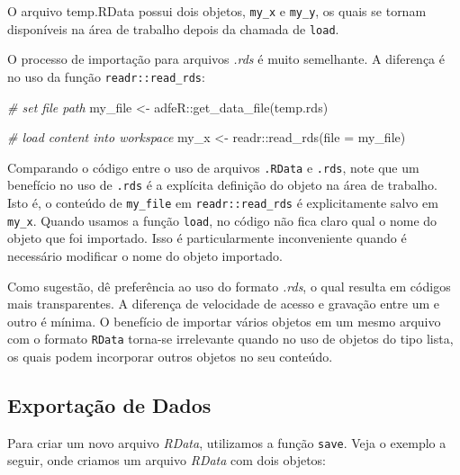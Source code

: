 \documentclass[
  11pt,
]{book}
\newenvironment{Shaded}{\begin{snugshade}}{\end{snugshade}}
\newcommand{\AttributeTok}[1]{\textcolor[rgb]{0.61,0.61,0.61}{#1}}
\newcommand{\CommentTok}[1]{\textcolor[rgb]{0.37,0.37,0.37}{\textit{#1}}}
\newcommand{\FunctionTok}[1]{\textcolor[rgb]{0,0,0}{#1}}
\newcommand{\NormalTok}[1]{#1}
\newcommand{\OtherTok}[1]{\textcolor[rgb]{0.37,0.37,0.37}{#1}}
\newcommand{\SpecialCharTok}[1]{\textcolor[rgb]{0,0,0}{#1}}
\newcommand{\StringTok}[1]{\textcolor[rgb]{0.5,0.5,0.5}{#1}}
\newenvironment{rmdimportant}
{\begin{importantblock}

	} {\end{importantblock}}
\begin{document}
O arquivo temp.RData possui dois objetos, \texttt{my\_x} e \texttt{my\_y}, os quais se tornam disponíveis na área de trabalho depois da chamada de \texttt{load}.

O processo de importação para arquivos \emph{.rds} é muito semelhante. A diferença é no uso da função \texttt{readr::read\_rds}:

\begin{Shaded}
\begin{Highlighting}[]
\CommentTok{\# set file path}
\NormalTok{my\_file }\OtherTok{\textless{}{-}}\NormalTok{ adfeR}\SpecialCharTok{::}\FunctionTok{get\_data\_file}\NormalTok{(}\StringTok{\textquotesingle{}temp.rds\textquotesingle{}}\NormalTok{)}

\CommentTok{\# load content into workspace}
\NormalTok{my\_x }\OtherTok{\textless{}{-}}\NormalTok{ readr}\SpecialCharTok{::}\FunctionTok{read\_rds}\NormalTok{(}\AttributeTok{file =}\NormalTok{ my\_file)}
\end{Highlighting}
\end{Shaded}

Comparando o código entre o uso de arquivos \texttt{.RData} e \texttt{.rds}, note que um benefício no uso de \texttt{.rds} é a explícita definição do objeto na área de trabalho. Isto é, o conteúdo de \texttt{my\_file} em \texttt{readr::read\_rds} é explicitamente salvo em \texttt{my\_x}. Quando usamos a função \texttt{load}, no código não fica claro qual o nome do objeto que foi importado. Isso é particularmente inconveniente quando é necessário modificar o nome do objeto importado.

\begin{rmdimportant}
Como sugestão, dê preferência ao uso do formato \emph{.rds}, o qual
resulta em códigos mais transparentes. A diferença de velocidade de
acesso e gravação entre um e outro é mínima. O benefício de importar
vários objetos em um mesmo arquivo com o formato \texttt{RData} torna-se
irrelevante quando no uso de objetos do tipo lista, os quais podem
incorporar outros objetos no seu conteúdo.
\end{rmdimportant}

\hypertarget{exportauxe7uxe3o-de-dados-2}{%
\subsection{Exportação de Dados}\label{exportauxe7uxe3o-de-dados-2}}

Para criar um novo arquivo \emph{RData}, utilizamos a função \texttt{save}. Veja o exemplo a seguir, onde criamos um arquivo \emph{RData} com dois objetos:
\end{document}
